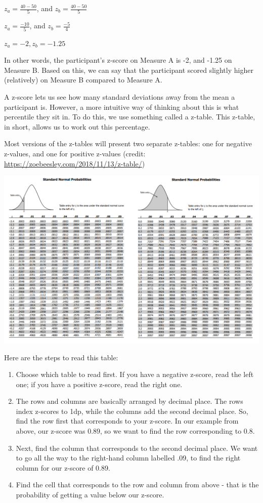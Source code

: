 \documentclass[
]{book}
\providecommand{\tightlist}{%
  \setlength{\itemsep}{0pt}\setlength{\parskip}{0pt}}
\begin{document}
\(z_a = \frac{40 - 50}{5}\), and \(z_b = \frac{40 - 50}{5}\)

\(z_a = \frac{-10}{5}\), and \(z_b = \frac{-5}{4}\)

\(z_a = -2, z_b = -1.25\)

In other words, the participant's z-score on Measure A is -2, and -1.25 on Measure B. Based on this, we can say that the participant scored slightly higher (relatively) on Measure B compared to Measure A.

A z-score lets us see how many standard deviations away from the mean a participant is. However, a more intuitive way of thinking about this is what percentile they sit in. To do this, we use something called a z-table. This z-table, in short, allows us to work out this percentage.

Most versions of the z-tables will present two separate z-tables: one for negative z-values, and one for positive z-values (credit: \url{https://zoebeesley.com/2018/11/13/z-table/})

\includegraphics{img/z-table.webp}

Here are the steps to read this table:

\begin{enumerate}
\def\labelenumi{\arabic{enumi}.}
\tightlist
\item
  Choose which table to read first. If you have a negative z-score, read the left one; if you have a positive z-score, read the right one.
\item
  The rows and columns are basically arranged by decimal place. The rows index z-scores to 1dp, while the columns add the second decimal place. So, find the row first that corresponds to your z-score. In our example from above, our z-score was 0.89, so we want to find the row corresponding to 0.8.
\item
  Next, find the column that corresponds to the second decimal place. We want to go all the way to the right-hand column labelled .09, to find the right column for our z-score of 0.89.
\item
  Find the cell that corresponds to the row and column from above - that is the probability of getting a value below our z-score.
\end{enumerate}
\end{document}
